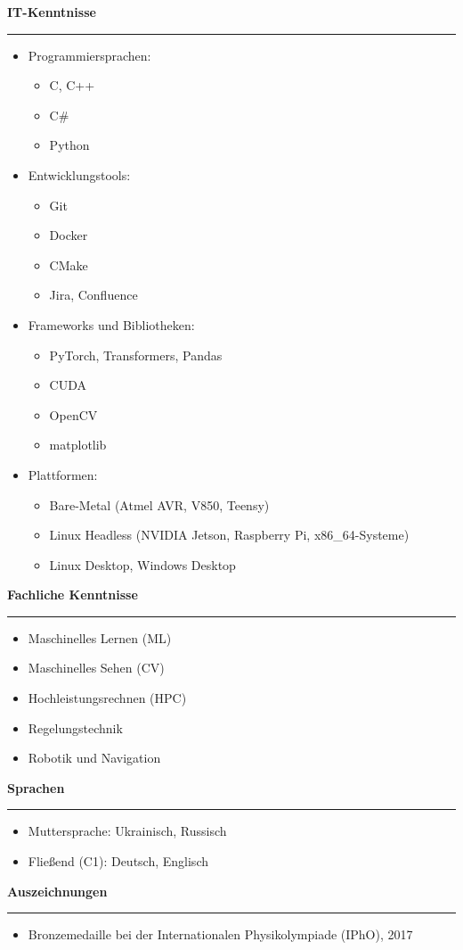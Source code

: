 \documentclass[12pt]{article} %
\newcommand{\HighlightedText}[1] {{\textbf{#1}}}
\newenvironment{ItemizeSection}[1]{
    \vspace{1mm}
    \HighlightedText{#1}
    \vspace{0.5mm}
    {\color{custom_blue} \hrule}
    \begin{itemize}[left=0.5em, topsep=0pt, itemsep=0pt, label={$\bullet$}]
}{
    \end{itemize}
}
\newenvironment{ItemizeSubsection}{
    \begin{itemize}[left=0.5em, topsep=-999pt, itemsep=0pt, label={$\circ$}]
}{
    \end{itemize}
}
\begin{document}
\newpage
\begin{ItemizeSection}{IT-Kenntnisse}
    \item Programmiersprachen:
    \begin{ItemizeSubsection}
        \item C, C++
        \item C\#
        \item Python
    \end{ItemizeSubsection}

    \item Entwicklungstools:
    \begin{ItemizeSubsection}
        \item Git
        \item Docker
        \item CMake
        \item Jira, Confluence
    \end{ItemizeSubsection}

    \item Frameworks und Bibliotheken:
    \begin{ItemizeSubsection}
        \item PyTorch, Transformers, Pandas
        \item CUDA
        \item OpenCV
        \item matplotlib
    \end{ItemizeSubsection}

    \item Plattformen:
    \begin{ItemizeSubsection}
        \item Bare-Metal (Atmel AVR, V850, Teensy)
        \item Linux Headless (NVIDIA Jetson, Raspberry Pi, x86\_64-Systeme)
        \item Linux Desktop, Windows Desktop
    \end{ItemizeSubsection}
\end{ItemizeSection}

\begin{ItemizeSection}{Fachliche Kenntnisse}
    \item Maschinelles Lernen (ML)
    \item Maschinelles Sehen (CV)
    \item Hochleistungsrechnen (HPC)
    \item Regelungstechnik
    \item Robotik und Navigation
\end{ItemizeSection}

\begin{ItemizeSection}{Sprachen}
    \item Muttersprache: Ukrainisch, Russisch
    \item Fließend (C1): Deutsch, Englisch
\end{ItemizeSection}

\begin{ItemizeSection}{Auszeichnungen}
    \item Bronzemedaille bei der Internationalen Physikolympiade (IPhO), 2017
\end{ItemizeSection}
\end{document}
